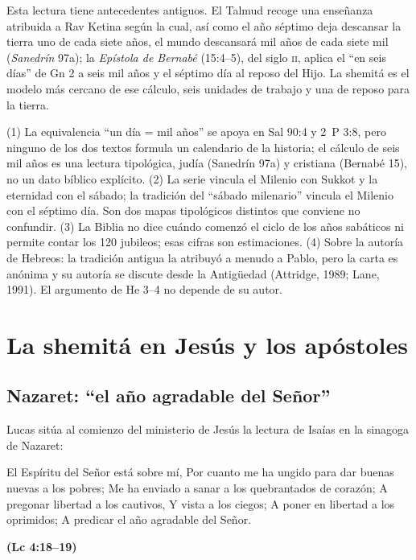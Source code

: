 \documentclass[11pt,letterpaper]{article}
\newcommand{\fuente}[1]{\par\hfill{\upshape\bfseries\small\textcolor{tierraroja}{#1}}}
\begin{document}
Esta lectura tiene antecedentes antiguos. El Talmud recoge una enseñanza atribuida a Rav Ketina según la cual, así como el año séptimo deja descansar la tierra uno de cada siete años, el mundo descansará mil años de cada siete mil (\emph{Sanedrín} 97a); la \emph{Epístola de Bernabé} (15:4--5), del siglo \textsc{ii}, aplica el ``en seis días'' de Gn 2 a seis mil años y el séptimo día al reposo del Hijo. La shemitá es el modelo más cercano de ese cálculo, seis unidades de trabajo y una de reposo para la tierra.

\begin{nota}[Precisión]
(1) La equivalencia ``un día = mil años'' se apoya en Sal 90:4 y 2~P 3:8, pero ninguno de los dos textos formula un calendario de la historia; el cálculo de seis mil años es una lectura tipológica, judía (Sanedrín 97a) y cristiana (Bernabé 15), no un dato bíblico explícito. (2) La serie vincula el Milenio con Sukkot y la eternidad con el sábado; la tradición del ``sábado milenario'' vincula el Milenio con el séptimo día. Son dos mapas tipológicos distintos que conviene no confundir. (3) La Biblia no dice cuándo comenzó el ciclo de los años sabáticos ni permite contar los 120 jubileos; esas cifras son estimaciones. (4) Sobre la autoría de Hebreos: la tradición antigua la atribuyó a menudo a Pablo, pero la carta es anónima y su autoría se discute desde la Antigüedad (Attridge, 1989; Lane, 1991). El argumento de He 3--4 no depende de su autor.
\end{nota}

\section{La shemitá en Jesús y los apóstoles}

\subsection{Nazaret: ``el año agradable del Señor''}
Lucas sitúa al comienzo del ministerio de Jesús la lectura de Isaías en la sinagoga de Nazaret:

\begin{cita}El Espíritu del Señor está sobre mí, Por cuanto me ha ungido para dar buenas nuevas a los pobres; Me ha enviado a sanar a los quebrantados de corazón; A pregonar libertad a los cautivos, Y vista a los ciegos; A poner en libertad a los oprimidos; A predicar el año agradable del Señor.\fuente{(Lc 4:18--19)}\end{cita}
\end{document}
